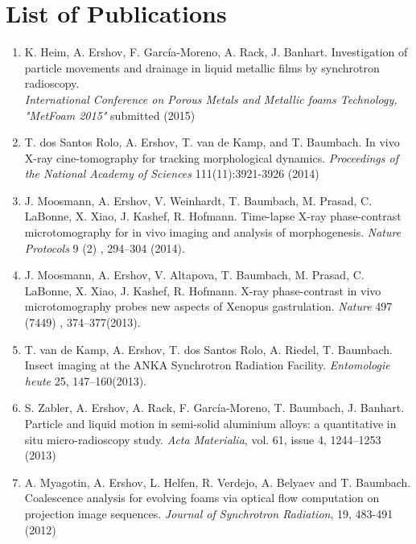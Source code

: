 \documentclass[a4paper,12pt, twoside]{book}
\begin{document}
\chapter {List of Publications}
\begin{enumerate}

\item K. Heim, A. Ershov, F. Garc\'ia-Moreno, A. Rack, J. Banhart.
Investigation of particle movements and drainage in liquid metallic films by synchrotron radioscopy. 
\\
\textit{International Conference on Porous Metals and Metallic foams Technology, "MetFoam 2015"} submitted (2015)

\item T. dos Santos Rolo, A. Ershov, T. van de Kamp, and T. Baumbach.
In vivo X-ray cine-tomography for tracking morphological dynamics. 
\textit{Proceedings of the National Academy of Sciences} 111(11):3921-3926 (2014)

\item J. Moosmann, A. Ershov, V. Weinhardt, T. Baumbach, M. Prasad, C. LaBonne, X. Xiao, J. Kashef, R. Hofmann. Time-lapse X-ray phase-contrast microtomography for in vivo imaging and analysis of morphogenesis.
\textit{Nature Protocols} 9 (2) , 294--304 (2014). 

\item J. Moosmann, A. Ershov, V. Altapova, T. Baumbach, M. Prasad, C. LaBonne, X. Xiao, J. Kashef, R. Hofmann. X-ray phase-contrast in vivo microtomography probes new aspects of Xenopus gastrulation.
\textit{Nature} 497 (7449) , 374--377(2013). 

\item T. van de Kamp, A. Ershov, T. dos Santos Rolo, A. Riedel, T. Baumbach. Insect imaging at the ANKA Synchrotron Radiation Facility.
\textit{Entomologie heute} 25, 147--160(2013). 

\item S. Zabler, A. Ershov, A. Rack, F. Garc\'ia-Moreno, T. Baumbach, J. Banhart.
Particle and liquid motion in semi-solid aluminium alloys: a quantitative in situ micro-radioscopy study.
\textit{Acta Materialia}, vol. 61, issue 4, 1244–1253 (2013)

\item A. Myagotin, A. Ershov, L. Helfen, R. Verdejo, A. Belyaev and T. Baumbach.
Coalescence analysis for evolving foams via optical flow computation on projection image sequences.
\textit{Journal of Synchrotron Radiation}, 19, 483-491 (2012)


\end{enumerate}
\end{document}
